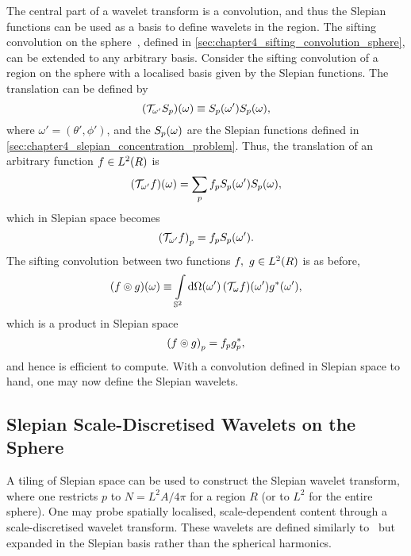 The central part of a wavelet transform is a convolution, and thus the Slepian functions can be used as a basis to define wavelets in the region.
The sifting convolution on the sphere~\autocite{Roddy2021}, defined in \cref{sec:chapter4_sifting_convolution_sphere}, can be extended to any arbitrary basis.
Consider the sifting convolution of a region on the sphere with a localised basis given by the Slepian functions.
The translation can be defined by
%
\begin{equation}
	\pixel{(\translation{\omega'}\slepian{S})}
	\equiv \pixel[']{\slepian{S}} \pixel{\slepian{S}},
\end{equation}
%
where \(\omega'=(\theta',\phi')\), and the \(\pixel{\slepian{S}}\) are the Slepian functions defined in \cref{sec:chapter4_slepian_concentration_problem}.
Thus, the translation of an arbitrary function \(f \in \hilbert{R}\) is
%
\begin{equation}
	\pixel{(\translation{\omega'}f)} = \slepianSum \slepian{f} \pixel[']{\slepian{S}} \pixel{\slepian{S}},
\end{equation}
%
which in Slepian space becomes
%
\begin{equation}
	\slepian{(\translation{\omega'}f)} = \slepian{f} \pixel[']{\slepian{S}}.
\end{equation}
%
The sifting convolution between two functions \(f,\ g \in \hilbert{R}\) is as before, \ie{}
%
\begin{equation}
	\pixel{\convolution{f}{g}}
	\equiv \integrateSphere{\omega'} \pixel[']{(\translation{\omega}f)} \pixel[']{\conj{g}},
\end{equation}
%
which is a product in Slepian space
%
\begin{equation}
	\slepian{\convolution{f}{g}}
	= \slepian{f} \conj{\slepian{g}},
\end{equation}
%
and hence is efficient to compute.
With a convolution defined in Slepian space to hand, one may now define the Slepian wavelets.

\subsection{Slepian Scale-Discretised Wavelets on the Sphere}\label{sec:chapter4_slepian_scale_discretised_wavelets_sphere}

A tiling of Slepian space can be used to construct the Slepian wavelet transform, where one restricts \(p\) to \(N=L^{2}A/4\pi{}\) for a region \(R\) (or to \(L^{2}\) for the entire sphere).
One may probe spatially localised, scale-dependent content through a scale-discretised wavelet transform.
These wavelets are defined similarly to~\autocite{Wiaux2008,McEwen2018} but expanded in the Slepian basis rather than the spherical harmonics.


